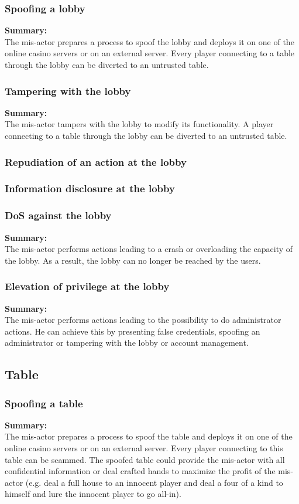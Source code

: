 \documentclass[a4paper,11pt]{report}
\begin{document}
\subsubsection{Spoofing a lobby}
\textbf{Summary:} \\
The mis-actor prepares a process to spoof the lobby and deploys it on one of the online casino servers or on an external server. Every player connecting to a table through the lobby can be diverted to an untrusted table.
\subsubsection{Tampering with the lobby}
\textbf{Summary:} \\
The mis-actor tampers with the lobby to modify its functionality. A player connecting to a table through the lobby can be diverted to an untrusted table. 
\subsubsection{Repudiation of an action at the lobby}
\subsubsection{Information disclosure at the lobby}
\subsubsection{DoS against the lobby}
\textbf{Summary:} \\
The mis-actor performs actions leading to a crash or overloading the capacity of the lobby. As a result, the lobby can no longer be reached by the users.
\subsubsection{Elevation of privilege at the lobby}
\textbf{Summary:} \\
The mis-actor performs actions leading to the possibility to do administrator actions. He can achieve this by presenting false credentials, spoofing an administrator or tampering with the lobby or account management.
\subsection{Table}
\subsubsection{Spoofing a table}
\textbf{Summary:} \\
The mis-actor prepares a process to spoof the table and deploys it on one of the online casino servers or on an external server. Every player connecting to this table can be scammed. The spoofed table could provide the mis-actor with all confidential information or deal crafted hands to maximize the profit of the mis-actor (e.g. deal a full house to an innocent player and deal a four of a kind to himself and lure the innocent player to go all-in).
\end{document}
